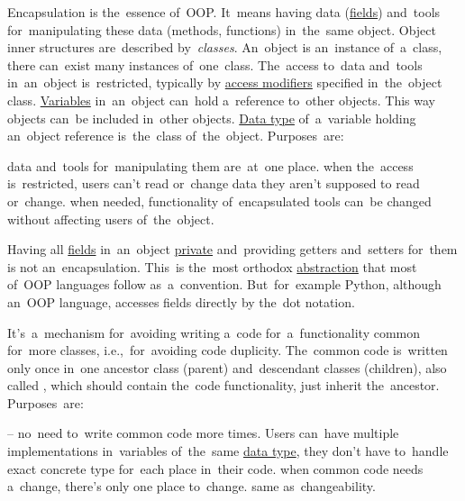
\label{encapsulation}
Encapsulation is the~essence of~OOP\@.
It~means having data (\hyperref[variablefieldproperty]{fields}) and~tools for~manipulating these data (methods, functions) in~the~same object.
Object inner structures are~described \mbox{by \textit{classes}}.
An~object is an~instance of~a~class, there can~exist many instances of~one~class.
The~access to~data and~tools in~an~object is~restricted, typically by \hyperref[javaaccessmodifiers]{access modifiers} specified in~the~object class.
\hyperref[variablefieldproperty]{Variables} in~an~object can~hold a~reference to~other objects.
This way objects can~be included in~other objects.
\hyperref[datatypes]{Data type} of~a~variable holding an~object reference is~the~class of~the~object.
Purposes~are:
\begin{itemize}
     data and~tools for~manipulating them are~at~one place.
     when the~access is~restricted, users can't read or~change data they aren't supposed to read or~change.
     when needed, functionality of~encapsulated tools can~be changed without affecting users of~the~object.
\end{itemize}
\newpage

\warning Having all \hyperref[variablefieldproperty]{fields} in~an~object \hyperref[javaprivate]{private} and~providing getters and~setters for~them is not an~encapsulation.
This~is the~most orthodox \hyperref[abstraction]{abstraction} that most of~OOP languages follow as~a~convention.
But~for~example Python, although an~OOP language, accesses fields directly by the~dot notation.

\label{inheritance}
It's~a~mechanism for~avoiding writing a~code for~a~functionality common for~more classes, i.e.,~for~avoiding code duplicity.
The~common code is~written only once in~one ancestor class (parent) and~descendant classes (children), also called , which should contain the~code functionality, just inherit the~ancestor.
Purposes~are:
\begin{itemize}
     -- no~need to~write common code more times.
            Users can~have multiple implementations in~variables of~the~same \hyperref[datatypes]{data type}, they don't have to~handle exact concrete type for~each place in~their code.
     when common code needs a~change, there's only one place to~change.
     same as~changeability.
\end{itemize}

